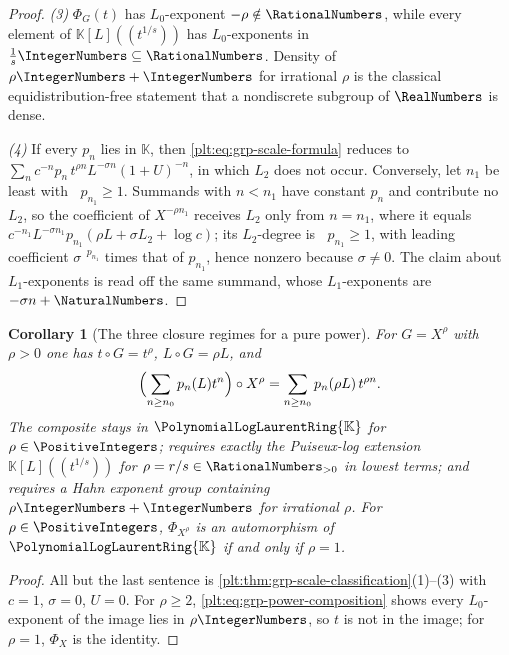 \documentclass[11pt,oneside]{article}
\theoremstyle{plain}
\newtheorem{corollary}[theorem]{Corollary}
\theoremstyle{definition}
\theoremstyle{remark}
\newcommand{\K}{\mathbb{K}}
\newcommand{\PLlau}{\PolynomialLogLaurentRing{\K}}       %
\DeclareMathOperator{\degL}{deg_{L}}
\newcommand{\compose}{\mathbin{\circ}}
\begin{document}
\begin{proof}
\emph{(3)} \(\Phi_G(t)\) has \(L_0\)-exponent \(-\rho\notin\RationalNumbers\),
while every element of \(\K[L]((t^{1/s}))\) has \(L_0\)-exponents in
\(\frac1s\IntegerNumbers\subseteq\RationalNumbers\).  Density of
\(\rho\IntegerNumbers+\IntegerNumbers\) for irrational \(\rho\) is the
classical equidistribution-free statement that a nondiscrete subgroup of
\(\RealNumbers\) is dense.

\emph{(4)} If every \(p_n\) lies in \(\K\), then
\eqref{plt:eq:grp-scale-formula} reduces to
\(\sum_nc^{-n}p_n\,t^{\rho n}L^{-\sigma n}(1+U)^{-n}\), in which \(L_2\) does
not occur.  Conversely, let \(n_1\) be least with \(\degL p_{n_1}\ge1\).
Summands with \(n<n_1\) have constant \(p_n\) and contribute no \(L_2\), so the
coefficient of \(X^{-\rho n_1}\) receives \(L_2\) only from \(n=n_1\), where it
equals \(c^{-n_1}L^{-\sigma n_1}p_{n_1}(\rho L+\sigma L_2+\log c)\); its
\(L_2\)-degree is \(\degL p_{n_1}\ge1\), with leading coefficient
\(\sigma^{\degL p_{n_1}}\) times that of \(p_{n_1}\), hence nonzero because
\(\sigma\ne0\).  The claim about \(L_1\)-exponents is read off the same
summand, whose \(L_1\)-exponents are \(-\sigma n+\NaturalNumbers\).
\end{proof}

\begin{corollary}[The three closure regimes for a pure power]
\label{plt:cor:grp-power-regimes}
For \(G=X^{\rho}\) with \(\rho>0\) one has \(t\compose G=t^{\rho}\),
\(L\compose G=\rho L\), and
\begin{equation}\label{plt:eq:grp-power-composition}
  \Bigl(\sum_{n\ge n_0}p_n(L)t^n\Bigr)\compose X^{\rho}
  =\sum_{n\ge n_0}p_n(\rho L)\,t^{\rho n}.
\end{equation}
The composite stays in \(\PLlau\) for \(\rho\in\PositiveIntegers\); requires
exactly the Puiseux-log extension \(\K[L]((t^{1/s}))\) for
\(\rho=r/s\in\RationalNumbers_{>0}\) in lowest terms; and requires a Hahn
exponent group containing \(\rho\IntegerNumbers+\IntegerNumbers\) for
irrational \(\rho\).  For \(\rho\in\PositiveIntegers\), \(\Phi_{X^{\rho}}\) is
an automorphism of \(\PLlau\) if and only if \(\rho=1\).
\end{corollary}

\begin{proof}
All but the last sentence is
\cref{plt:thm:grp-scale-classification}(1)--(3) with \(c=1\), \(\sigma=0\),
\(U=0\).  For \(\rho\ge2\), \eqref{plt:eq:grp-power-composition} shows every
\(L_0\)-exponent of the image lies in \(\rho\IntegerNumbers\), so \(t\) is not
in the image; for \(\rho=1\), \(\Phi_X\) is the identity.
\end{proof}
\end{document}
